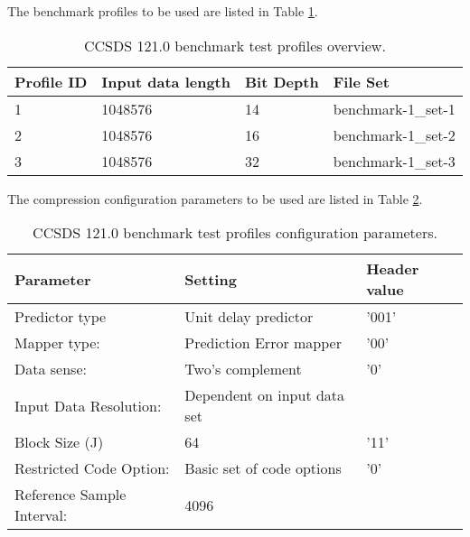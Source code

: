 The benchmark profiles to be used are listed in Table \ref{tab:ccsds121_profiles}.

\begin{table}[!h]
    \centering
    \begin{tabular}{|l|l|l|l|}
        \hline
        Profile ID 	    & Input data length	    & Bit Depth	    & File Set           \\ \hline 
        \hline
        1               & 1048576               & 14            & benchmark-1\_set-1 \\ \hline
        2               & 1048576               & 16            & benchmark-1\_set-2 \\ \hline
        3               & 1048576               & 32            & benchmark-1\_set-3 \\ \hline
    \end{tabular}
    \caption{CCSDS 121.0 benchmark test profiles overview.}
    \label{tab:ccsds121_profiles}
\end{table}

The compression configuration parameters to be used are listed in Table \ref{tab:ccsds121_params}.

\begin{table}[!h]
    \centering
    \begin{tabular}{|l|l|l|}
        \hline
        Parameter                               & Setting	                    & Header value \\ \hline 
        \hline
        Predictor type                          & Unit delay predictor          & '001' \\ \hline
        Mapper type:                            & Prediction Error mapper       & '00'  \\ \hline
        Data sense:                             & Two's complement              & '0'   \\ \hline
        Input Data Resolution:                  & Dependent on input data set   &       \\ \hline
        Block Size (J)                          & 64                            & '11'  \\ \hline
        Restricted Code Option:                 & Basic set of code options     & '0'   \\ \hline
        Reference Sample Interval:              & 4096                          &       \\ \hline
    \end{tabular}
    \caption{CCSDS 121.0 benchmark test profiles configuration parameters.}
    \label{tab:ccsds121_params}
\end{table}

